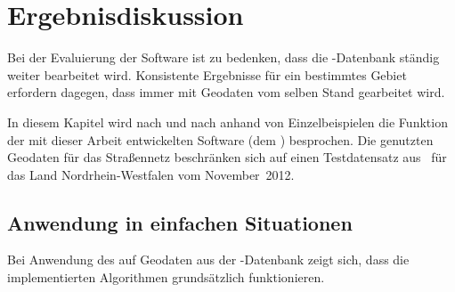 \documentclass[../main/thesis.tex]{subfiles}
\begin{document}
\chapter{Ergebnisdiskussion}
\label{ch:result}

Bei der Evaluierung der Software ist zu bedenken, dass die \osm-Datenbank ständig weiter bearbeitet wird.
Konsistente Ergebnisse für ein bestimmtes Gebiet erfordern dagegen, dass immer mit Geodaten vom selben Stand gearbeitet wird.

In diesem Kapitel wird nach und nach anhand von Einzelbeispielen die Funktion der mit dieser Arbeit entwickelten Software (dem ) besprochen.
Die genutzten Geodaten für das Straßennetz beschränken sich auf einen Testdatensatz aus \osm\ für das Land Nordrhein-Westfalen vom November~2012.




\section{Anwendung in einfachen Situationen}
\label{ch:result-trivial}

Bei Anwendung des  auf Geodaten aus der \osm-Datenbank zeigt sich, dass die implementierten Algorithmen grundsätzlich funktionieren.

\end{document}
